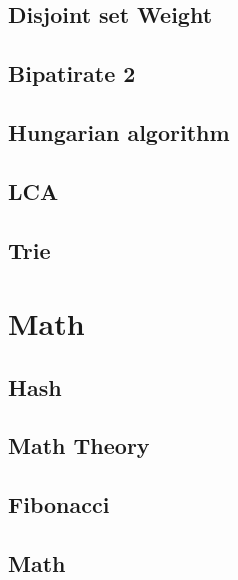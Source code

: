         \subsection{Disjoint set Weight}
                
        \subsection{Bipatirate 2}
                
        \subsection{Hungarian algorithm}
                
        \subsection{LCA}
                
        \subsection{Trie}
                

\section{Math}
        \subsection{Hash}
                
        \subsection{Math Theory}
                
        \subsection{Fibonacci}
                
        \subsection{Math}
                
